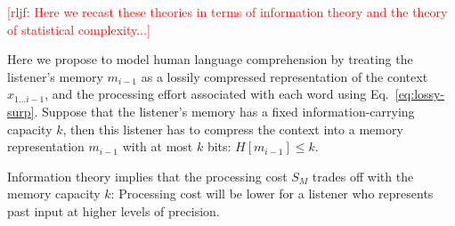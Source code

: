 \documentclass[12pt]{article}
\newcommand{\jd}[1]{\textcolor{Red}{[jd: #1]}}
\newcommand{\rljf}[1]{\textcolor{Red}{[rljf: #1]}}
\begin{document}
\rljf{Here we recast these theories in terms of information theory and the theory of statistical complexity...}


Here we propose to model human language comprehension by treating the listener's memory $m_{i-1}$ as a lossily compressed representation of the context $x_{1...i-1}$, and the processing effort associated with each word using Eq.~\ref{eq:lossy-surp}.
Suppose that the listener's memory has a fixed information-carrying capacity $k$, then this listener has to compress the context into a memory representation $m_{i-1}$ with at most $k$ bits: $H[m_{i-1}] \leq k$.


Information theory implies that the processing cost $S_M$ trades off with the memory capacity $k$:
Processing cost will be lower for a listener who represents past input at higher levels of precision.




%
\end{document}
